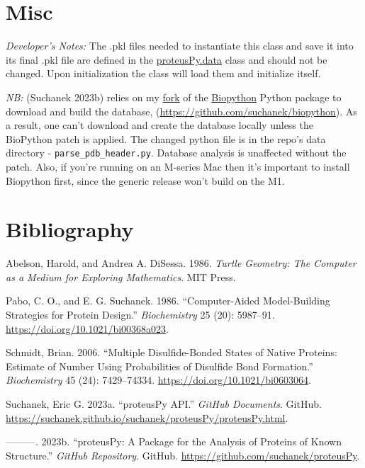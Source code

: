 \hypertarget{misc}{%
\section{Misc}\label{misc}}

\emph{Developer's Notes:} The .pkl files needed to instantiate this
class and save it into its final .pkl file are defined in the
\href{\%22https://suchanek.github.io/proteusPy/proteusPy/data.html\%22}{proteusPy.data}
class and should not be changed. Upon initialization the class will load
them and initialize itself.

\emph{NB:} (Suchanek 2023b) relies on my
\href{https://github.com/suchanek/biopython}{fork} of the
\href{https://biopython.org}{Biopython} Python package to download and
build the database, (\url{https://github.com/suchanek/biopython}). As a
result, one can't download and create the database locally unless the
BioPython patch is applied. The changed python file is in the repo's
data directory - \texttt{parse\_pdb\_header.py}. Database analysis is
unaffected without the patch. Also, if you're running on an M-series Mac
then it's important to install Biopython first, since the generic
release won't build on the M1.

\hypertarget{bibliography}{%
\section*{Bibliography}\label{bibliography}}

\hypertarget{refs}{}
\begin{CSLReferences}{1}{0}
\leavevmode{}%
Abelson, Harold, and Andrea A. DiSessa. 1986. \emph{Turtle Geometry: The
Computer as a Medium for Exploring Mathematics}. MIT Press.

\leavevmode{}%
Pabo, C. O., and E. G. Suchanek. 1986. {``Computer-Aided Model-Building
Strategies for Protein Design.''} \emph{Biochemistry} 25 (20): 5987--91.
\url{https://doi.org/10.1021/bi00368a023}.

\leavevmode{}%
Schmidt, Brian. 2006. {``Multiple Disulfide-Bonded States of Native
Proteins: Estimate of Number Using Probabilities of Disulfide Bond
Formation.''} \emph{Biochemistry} 45 (24): 7429--74334.
\url{https://doi.org/10.1021/bi0603064}.

\leavevmode{}%
Suchanek, Eric G. 2023a. {``proteusPy API.''} \emph{GitHub Documents}.
GitHub.
\url{https://suchanek.github.io/suchanek/proteusPy/proteusPy.html}.

\leavevmode{}%
---------. 2023b. {``proteusPy: A Package for the Analysis of Proteins
of Known Structure.''} \emph{GitHub Repository}. GitHub.
\url{https://github.com/suchanek/proteusPy}.

\end{CSLReferences}
